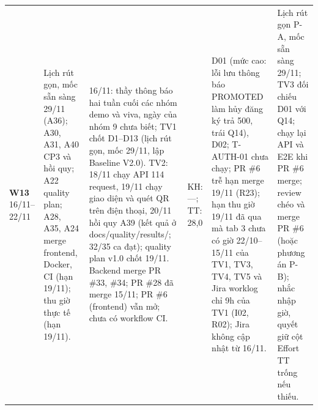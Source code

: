 \begin{landscape}
\begin{longtable}{L{1.69cm}L{3.73cm}L{5.08cm}L{1.86cm}L{3.39cm}L{3.73cm}}
\textbf{W13} 16/11--22/11 & Lịch rút gọn, mốc sẵn sàng 29/11 (A36); A30, A31, A40 CP3 và hồi quy; A22 quality plan; A28, A35, A24 merge frontend, Docker, CI (hạn 19/11); thu giờ thực tế (hạn 19/11). & 16/11: thầy thông báo hai tuần cuối các nhóm demo và viva, ngày của nhóm 9 chưa biết; TV1 chốt D1–D13 (lịch rút gọn, mốc 29/11, lập Baseline V2.0). TV2: 18/11 chạy API 114 request, 19/11 chạy giao diện và quét QR trên điện thoại, 20/11 hồi quy A39 (kết quả ở docs/quality/results/; 32/35 ca đạt); quality plan v1.0 chốt 19/11. Backend merge PR \#33, \#34; PR \#28 đã merge 15/11; PR \#6 (frontend) vẫn mở; chưa có workflow CI. & KH: ---; TT: 28,0 & D01 (mức cao: lỗi lưu thông báo PROMOTED làm hủy đăng ký trả 500, trái Q14), D02; T-AUTH-01 chưa chạy; PR \#6 trễ hạn merge 19/11 (R23); hạn thu giờ 19/11 đã qua mà tab 3 chưa có giờ 22/10–15/11 của TV1, TV3, TV4, TV5 và Jira worklog chỉ 9h của TV1 (I02, R02); Jira không cập nhật từ 16/11. & Lịch rút gọn P-A, mốc sẵn sàng 29/11; TV3 đối chiếu D01 với Q14; chạy lại API và E2E khi PR \#6 merge; review chéo và merge PR \#6 (hoặc phương án P-B); nhắc nhập giờ, quyết giữ cột Effort TT trống nếu thiếu. \\
\end{longtable}
\endgroup
\end{landscape}
